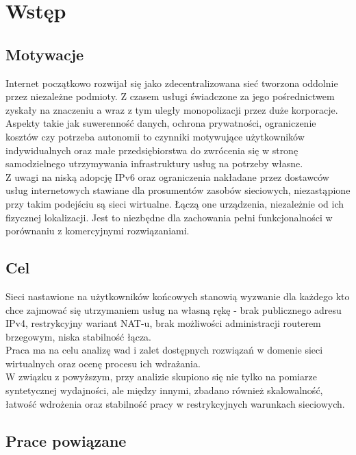 \section{Wstęp}

\subsection{Motywacje}

Internet początkowo rozwijał się jako zdecentralizowana sieć tworzona oddolnie przez niezależne podmioty. Z czasem usługi świadczone za jego pośrednictwem zyskały na znaczeniu a wraz z tym uległy monopolizacji przez duże korporacje.\\

Aspekty takie jak suwerenność danych, ochrona prywatności, ograniczenie kosztów czy potrzeba autonomii to czynniki motywujące użytkowników indywidualnych oraz małe przedsiębiorstwa do zwrócenia się w stronę samodzielnego utrzymywania infrastruktury usług na potrzeby własne.\\

Z uwagi na niską adopcję IPv6 oraz ograniczenia nakładane przez dostawców usług internetowych stawiane dla prosumentów zasobów sieciowych, niezastąpione przy takim podejściu są sieci wirtualne. Łączą one urządzenia, niezależnie od ich fizycznej lokalizacji. Jest to niezbędne dla zachowania pełni funkcjonalności w porównaniu z komercyjnymi rozwiązaniami.

\subsection{Cel}

Sieci nastawione na użytkowników końcowych stanowią wyzwanie dla każdego kto chce zajmować się utrzymaniem usług na własną rękę - brak publicznego adresu IPv4, restrykcyjny wariant NAT-u, brak możliwości administracji routerem brzegowym, niska stabilność łącza.\\

Praca ma na celu analizę wad i zalet dostępnych rozwiązań w domenie sieci wirtualnych oraz ocenę procesu ich wdrażania.\\

W związku z powyższym, przy analizie skupiono się nie tylko na pomiarze syntetycznej wydajności, ale między innymi, zbadano również skalowalność, łatwość wdrożenia oraz stabilność pracy w restrykcyjnych warunkach sieciowych.

\subsection{Prace powiązane}

